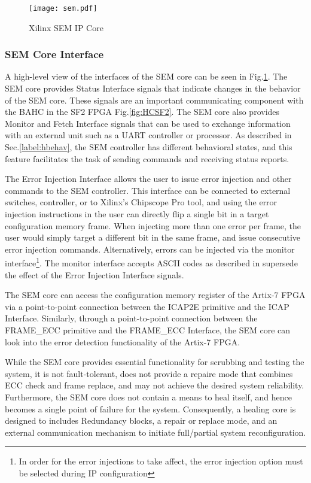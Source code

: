 \begin{figure}[!ht]
    \centering
        \texttt{[image: sem.pdf]}
        \caption{Xilinx SEM IP Core \cite{SEM.Xilinx-15}}
    \label{fig:sem}
\end{figure}

\subsubsection{SEM Core Interface}
A high-level view of the interfaces of the SEM core can be seen in Fig.\ref{fig:sem}. The SEM core provides Status Interface signals that indicate changes in the behavior of the SEM core. These signals are an important communicating component with the BAHC in the SF2 FPGA Fig.\ref{fig:HCSF2}. The SEM core also provides Monitor and Fetch Interface signals that can be used to exchange information with an external unit such as a UART controller or processor. As described in Sec.\ref{label:hbehav}, the SEM controller has different behavioral states, and this feature facilitates the task of sending commands and receiving status reports. 

The Error Injection Interface allows the user to issue error injection and other commands to the SEM controller. This interface can be connected to external switches, controller, or to Xilinx's Chipscope Pro tool, and using the error injection instructions in \cite{SEM.Xilinx-15} the user can directly flip a single bit in a target configuration memory frame. When injecting more than one error per frame, the user would simply target a different bit in the same frame, and issue consecutive error injection commands. Alternatively, errors can be injected via the monitor interface\footnote{In order for the error injections to take affect, the error injection option must be selected during IP configuration}. The monitor interface accepts ASCII codes as described in \cite{SEM.Xilinx-15} supersede the effect of the Error Injection Interface signals.   

The SEM core can access the configuration memory register of the Artix-7 FPGA via a point-to-point connection between the ICAP2E primitive and the ICAP Interface. Similarly, through a point-to-point connection between the FRAME\_ECC primitive and the FRAME\_ECC Interface, the SEM core can look into the error detection functionality of the Artix-7 FPGA. 

While the SEM core provides essential functionality for scrubbing and testing the system, it is not fault-tolerant, does not provide a repaire mode that combines ECC check and frame replace, and may not achieve the desired system reliability. Furthermore, the SEM core does not contain a means to heal itself, and hence becomes a single point of failure for the system. Consequently, a healing core is designed to includes Redundancy blocks, a repair or replace mode, and an external communication mechanism to initiate full/partial system reconfiguration.


